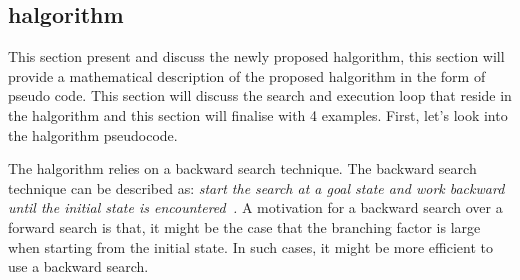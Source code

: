 \subsection{\acl{halgorithm}}%
\label{subsec:halgorithm}
This section present and discuss the newly proposed \ac{halgorithm}, this section will provide a mathematical description of the proposed \ac{halgorithm} in the form of pseudo code. This section will discuss the search and execution loop that reside in the \ac{halgorithm} and this section will finalise with 4 examples. First, let's look into the \ac{halgorithm} pseudocode.\bs

The \ac{halgorithm} relies on a backward search technique. The backward search technique can be described as: \textit{start the search at a goal state and work backward until the initial state is encountered~\cite{lavalle_planning_2006}.} A motivation for a backward search over a forward search is that, it might be the case that the branching factor is large when starting from the initial state. In such cases, it might be more efficient to use a backward search.

